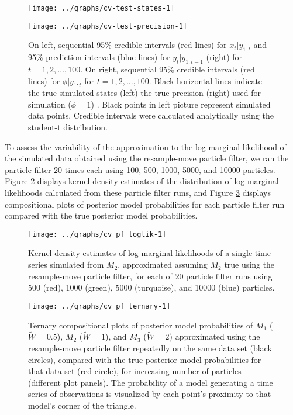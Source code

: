 \documentclass{article}
\begin{document}
\begin{figure}
\begin{minipage}{0.5\textwidth}
\texttt{[image: ../graphs/cv-test-states-1]}
\end{minipage}
\begin{minipage}{0.5\textwidth}
\texttt{[image: ../graphs/cv-test-precision-1]}
\end{minipage}
\caption{On left, sequential 95\% credible intervals (red lines) for $x_t|y_{1:t}$ and 95\% prediction intervals (blue lines) for $y_t|y_{1:t-1}$ (right) for $t = 1, 2, \ldots, 100$. On right, sequential 95\% credible intervals (red lines) for $\phi|y_{1:t}$ for $t = 1, 2, \ldots, 100$. Black horizontal lines indicate the true simulated states (left) the true precision (right) used for simulation ($\phi = 1$) . Black points in left picture represent simulated data points. Credible intervals were calculated analytically using the student-t distribution.} \label{fig:sim}
\end{figure}

To assess the variability of the approximation to the log marginal likelihood of the simulated data obtained using the resample-move particle filter, we ran the particle filter 20 times each using 100, 500, 1000, 5000, and 10000 particles. Figure \ref{fig:pf-hist} displays kernel density estimates of the distribution of log marginal likelihoods calculated from these particle filter runs, and Figure \ref{fig:pf-1sim-ternary} displays compositional plots of posterior model probabilities for each particle filter run compared with the true posterior model probabilities.

\begin{figure}
\texttt{[image: ../graphs/cv\_pf\_loglik-1]}
\caption{Kernel density estimates of log marginal likelihoods of a single time series simulated from $M_2$, approximated assuming $M_2$ true using the resample-move particle filter, for each of 20 particle filter runs using 500 (red), 1000 (green), 5000 (turquoise), and 10000 (blue) particles.} \label{fig:pf-hist}
\end{figure}

\begin{figure}
\texttt{[image: ../graphs/cv\_pf\_ternary-1]}
\caption{Ternary compositional plots of posterior model probabilities of $M_1$ ($\tilde{W} = 0.5$), $M_2$ ($\tilde{W} = 1$), and $M_3$ ($\tilde{W} = 2$) approximated using the resample-move particle filter repeatedly on the same data set (black circles), compared with the true posterior model probabilities for that data set (red circle), for increasing number of particles (different plot panels). The probability of a model generating a time series of observations is visualized by each point's proximity to that model's corner of the triangle.} \label{fig:pf-1sim-ternary}
\end{figure}
\end{document}
